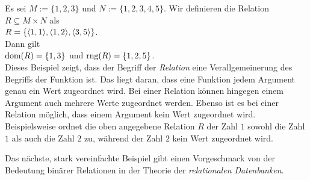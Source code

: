 \example
Es sei $M := \{1,2,3\}$ und $N := \{1,2,3,4,5\}$.  Wir definieren die Relation $R \subseteq M \times N$ 
als
\\[0.2cm]
\hspace*{1.3cm}
 $R = \{ \pair(1,1), \pair(1,2), \pair(3,5) \}$.  
\\[0.2cm]
Dann gilt 
\\[0.2cm]
\hspace*{1.3cm} $\textrm{dom}(R) = \{1,3\}$ \quad und \quad $\textrm{rng}(R) = \{1,2,5\}$. 
\\[0.2cm]
Dieses Beispiel zeigt, dass der Begriff der \emph{Relation} eine Verallgemeinerung des Begriffs
der Funktion ist.  Das liegt daran, dass eine Funktion jedem Argument genau ein Wert zugeordnet
wird.  Bei einer Relation k\"{o}nnen hingegen einem Argument auch mehrere Werte zugeordnet werden.
Ebenso ist es bei einer Relation m\"{o}glich, dass einem Argument kein Wert zugeordnet wird.
Beispielsweise ordnet die oben angegebene Relation $R$ der Zahl $1$ sowohl die Zahl $1$ als auch die
Zahl $2$ zu, w\"{a}hrend der Zahl $2$ kein Wert zugeordnet wird.
\eox

\noindent
Das n\"{a}chste, stark vereinfachte Beispiel gibt einen Vorgeschmack von der Bedeutung bin\"{a}rer
Relationen in der Theorie der \emph{relationalen Datenbanken}.

